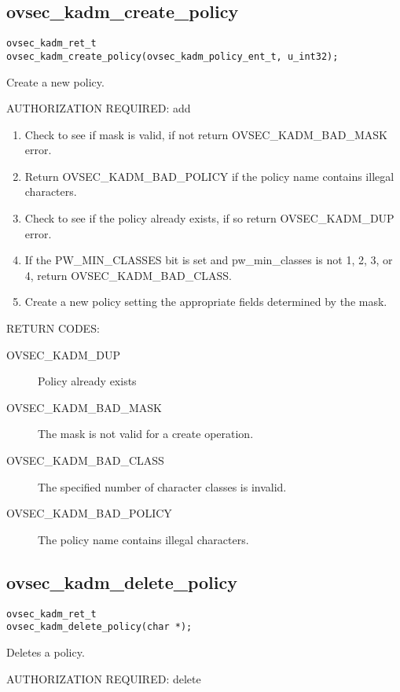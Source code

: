 \subsection{ovsec_kadm_create_policy}

\begin{verbatim}
ovsec_kadm_ret_t
ovsec_kadm_create_policy(ovsec_kadm_policy_ent_t, u_int32); 
\end{verbatim}

Create a new policy.

AUTHORIZATION REQUIRED: add

\begin{enumerate}
\item Check to see if mask is valid, if not return OVSEC_KADM_BAD_MASK error.
\item Return OVSEC_KADM_BAD_POLICY if the policy name contains illegal
characters.

\item Check to see if the policy already exists, if so return
OVSEC_KADM_DUP error. 
\item If the PW_MIN_CLASSES bit is set and pw_min_classes is not 1, 2,
3, or 4, return OVSEC_KADM_BAD_CLASS.
\item Create a new policy setting the appropriate fields determined
by the mask.
\end{enumerate}

RETURN CODES:

\begin{description}
\item[OVSEC_KADM_DUP] Policy already exists
\item[OVSEC_KADM_BAD_MASK] The mask is not valid for a create
operation.
\item[OVSEC_KADM_BAD_CLASS] The specified number of character classes
is invalid.
\item[OVSEC_KADM_BAD_POLICY] The policy name contains illegal characters.
\end{description}

\subsection{ovsec_kadm_delete_policy}

\begin{verbatim}
ovsec_kadm_ret_t
ovsec_kadm_delete_policy(char *);
\end{verbatim}

Deletes a policy.

AUTHORIZATION REQUIRED: delete

